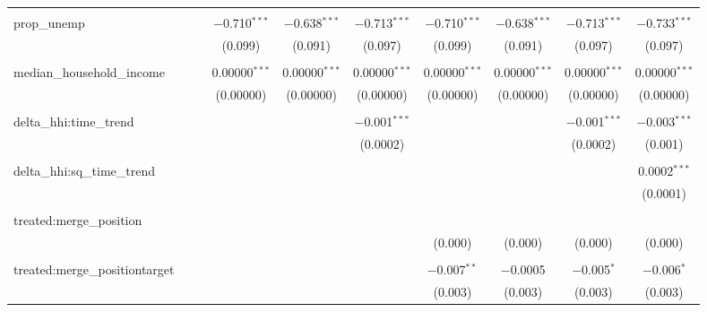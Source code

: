 \begin{table}[H]
{\begin{tabular}{@{\extracolsep{5pt}}lccccccccc}
   & & & & & & & & & \\  

  prop\_unemp &  &  & $-$0.710$^{***}$ & $-$0.638$^{***}$ & $-$0.713$^{***}$ & $-$0.710$^{***}$ & $-$0.638$^{***}$ & $-$0.713$^{***}$ & $-$0.733$^{***}$ \\  

   &  &  & (0.099) & (0.091) & (0.097) & (0.099) & (0.091) & (0.097) & (0.097) \\  

   & & & & & & & & & \\  

  median\_household\_income &  &  & 0.00000$^{***}$ & 0.00000$^{***}$ & 0.00000$^{***}$ & 0.00000$^{***}$ & 0.00000$^{***}$ & 0.00000$^{***}$ & 0.00000$^{***}$ \\  

   &  &  & (0.00000) & (0.00000) & (0.00000) & (0.00000) & (0.00000) & (0.00000) & (0.00000) \\  

   & & & & & & & & & \\  

  delta\_hhi:time\_trend &  &  &  &  & $-$0.001$^{***}$ &  &  & $-$0.001$^{***}$ & $-$0.003$^{***}$ \\  

   &  &  &  &  & (0.0002) &  &  & (0.0002) & (0.001) \\  

   & & & & & & & & & \\  

  delta\_hhi:sq\_time\_trend &  &  &  &  &  &  &  &  & 0.0002$^{***}$ \\  

   &  &  &  &  &  &  &  &  & (0.0001) \\  

   & & & & & & & & & \\  

  treated:merge\_position &  &  &  &  &  &  &  &  &  \\  

   &  &  &  &  &  & (0.000) & (0.000) & (0.000) & (0.000) \\  

   & & & & & & & & & \\  

  treated:merge\_positiontarget &  &  &  &  &  & $-$0.007$^{**}$ & $-$0.0005 & $-$0.005$^{*}$ & $-$0.006$^{*}$ \\  

   &  &  &  &  &  & (0.003) & (0.003) & (0.003) & (0.003) \\  


\end{tabular}}
\end{table}
